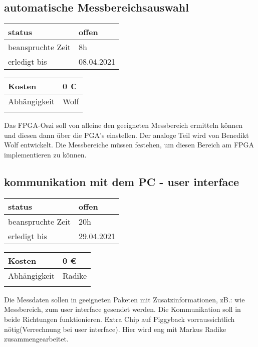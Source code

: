 \documentclass{scrartcl}
\begin{document}
\subsection{automatische Messbereichsauswahl}
\begin{tabular}[h]{|l|l|} %
	\hline
	status & offen\\
	\hline
	beanspruchte Zeit & 8h \\
	\hline
	erledigt bis & 08.04.2021 \\
	\hline
\end{tabular}
\begin{tabular}[h]{|l|l|} %
	\hline
	Kosten & 0 €\\
	\hline
	Abhängigkeit & Wolf\\
	\hline
	 &  \\
	\hline
\end{tabular}
Das FPGA-Oszi soll von alleine den geeigneten Messbereich ermitteln können und diesen dann über die PGA's einstellen. Der analoge Teil wird von Benedikt Wolf entwickelt. Die Messbereiche müssen festehen, um diesen Bereich am FPGA implementieren zu können.
\subsection{kommunikation mit dem PC - user interface}
\begin{tabular}[h]{|l|l|} %
	\hline
	status & offen\\
	\hline
	beanspruchte Zeit & 20h \\
	\hline
	erledigt bis & 29.04.2021 \\
	\hline
\end{tabular}
\begin{tabular}[h]{|l|l|} %
	\hline
	Kosten & 0 €\\
	\hline
	Abhängigkeit & Radike\\
	\hline
	 &  \\
	\hline
\end{tabular}
Die Messdaten sollen in geeigneten Paketen mit Zusatzinformationen, zB.: wie Messbereich, zum user interface gesendet werden. Die Kommunikation soll in beide Richtungen funktionieren. Extra Chip auf Piggyback vorraussichtlich nötig(Verrechnung bei user interface). Hier wird eng mit Markus Radike zusammengearbeitet.
\end{document}
